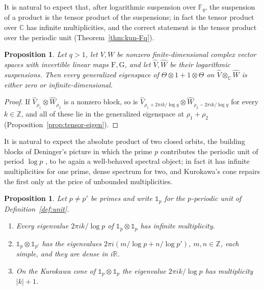 \documentclass[11pt]{amsart}
\theoremstyle{plain}
\newtheorem{proposition}[theorem]{Proposition}
\theoremstyle{definition}
\theoremstyle{remark}
\numberwithin{equation}{section}
\newcommand{\C}{\mathbb{C}}
\newcommand{\R}{\mathbb{R}}
\newcommand{\Z}{\mathbb{Z}}
\newcommand{\F}{\mathbb{F}}
\begin{document}
It is natural to expect that, after logarithmic suspension over $\F_q$,
the suspension of a product is the tensor product of the suspensions;
in fact the tensor product over $\C$ has infinite multiplicities, and the
correct statement is the tensor product over the periodic unit
(Theorem~\ref{thm:kun-Fq}).

\begin{proposition}\label{prop:kun-Fq-C}
Let $q>1$, let $V,W$ be nonzero finite-dimensional complex vector spaces
with invertible linear maps $\mathrm{F},\mathrm{G}$, and let
$\widehat V,\widehat W$ be their logarithmic suspensions. Then every
generalized eigenspace of $\Theta\otimes1+1\otimes\Theta$ on
$\widehat V\otimes_\C\widehat W$ is either zero or infinite-dimensional.
\end{proposition}

\begin{proof}
If $\widehat V_{\rho_1}\otimes\widehat W_{\rho_2}$ is a nonzero block,
so is $\widehat V_{\rho_1+2\pi ik/\log q}\otimes
\widehat W_{\rho_2-2\pi ik/\log q}$ for every $k\in\Z$, and all of these
lie in the generalized eigenspace at $\rho_1+\rho_2$
(Proposition~\ref{prop:tensor-eigen}).
\end{proof}

It is natural to expect the absolute product of two closed orbits, the
building blocks of Deninger's picture in which the prime $p$
contributes the periodic unit of period $\log p$
\cite[pp.~167--168 and p.~181]{Deninger1998Analogies}, to be again a
well-behaved
spectral object; in fact it has infinite multiplicities for one prime,
dense spectrum for two, and Kurokawa's cone repairs the first only at
the price of unbounded multiplicities.

\begin{proposition}\label{prop:kun-orbits}
Let $p\ne p'$ be primes and write $\mathbb 1_p$ for the $p$-periodic
unit of Definition~\ref{def:unit}.
\begin{enumerate}[label=(\roman*)]
\item\label{item:ko-same} Every eigenvalue $2\pi ik/\log p$ of
  $\mathbb 1_p\otimes\mathbb 1_p$ has infinite multiplicity.
\item\label{item:ko-dense} $\mathbb 1_p\otimes\mathbb 1_{p'}$ has the
  eigenvalues $2\pi i(m/\log p+n/\log p')$, $m,n\in\Z$, each simple,
  and they are dense in $i\R$.
\item\label{item:ko-cone} On the Kurokawa cone of
  $\mathbb 1_p\otimes\mathbb 1_p$ the eigenvalue $2\pi ik/\log p$ has
  multiplicity $|k|+1$.
\end{enumerate}
\end{proposition}
\end{document}
